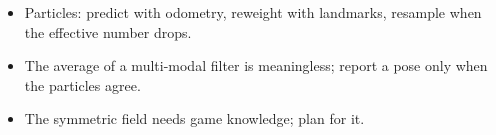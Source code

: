 \begin{keyidea}
\begin{itemize}[nosep]
  \item Particles: predict with odometry, reweight with landmarks, resample when the effective number drops.
  \item The average of a multi-modal filter is meaningless; report a pose only when the particles agree.
  \item The symmetric field needs game knowledge; plan for it.
\end{itemize}
\end{keyidea}
